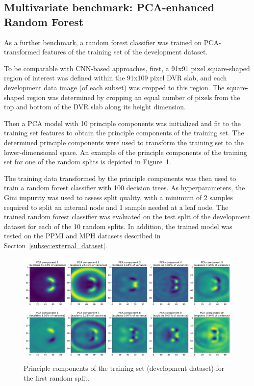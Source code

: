 \subsection{Multivariate benchmark: PCA-enhanced Random Forest}
\label{subsec:pca_rfc}

As a further benchmark, a random forest classifier was trained on PCA-transformed features of the training set 
of the development dataset.

To be comparable with CNN-based approaches, first, a 91x91 pixel square-shaped region of interest 
was defined within the 91x109 pixel DVR slab, and each development data image (of each subset) was cropped to this region.
The square-shaped region was determined by cropping an equal number of pixels from the top and bottom 
of the DVR slab along its height dimension.

Then a PCA model with 10 principle components was initialized and fit to the training set features to obtain 
the principle components of the training set.
The determined principle components were used to transform the training set to the lower-dimensional space.
An example of the principle components of the training set for one of the random splits is depicted in Figure~\ref{fig:pca_components}.

The training data transformed by the principle components was then used to train a random forest classifier with 100 decision trees.
As hyperparameters, the Gini impurity was used to assess split quality, 
with a minimum of 2 samples required to split an internal node and 1 sample needed at a leaf node.
The trained random forest classifier was evaluated on the test split of the development dataset for each of the 10 random splits.
In addition, the trained model was tested on the PPMI and MPH datasets described in Section~\ref{subsec:external_dataset}.

\begin{figure}[ht]
  \centering
  \includegraphics[width=1.0\textwidth]{content/figures/pca_components_splittrain.png}
  \caption{Principle components of the training set (development dataset) for the first random split.} 
  \label{fig:pca_components}
\end{figure} 

